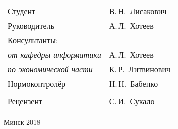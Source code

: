 \begin{titlepage}
\begin{center}
    \begin{tabular}{ p{}p{} }
      Студент & В.\,Н.~Лисакович \\
      Руководитель & А.\,Л.~Хотеев \\
      Консультанты: &\\
      \hspace*{3ex}\emph{от кафедры информатики} & А.\,Л.~Хотеев \\
      \hspace*{3ex}\emph{по экономической части} & К.\,Р.~Литвинович \\
      Нормоконтролёр & Н.\,Н.~Бабенко\\
      & \\
      Рецензент & С.\,И.~Сукало\\
    \end{tabular}
    
    \vfill
    {\normalsize Минск 2018}
  \end{center}
\end{titlepage}

